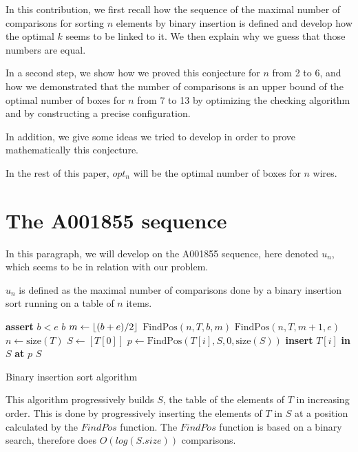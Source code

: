\documentclass[11pt, a4paper]{article}
\DeclarePairedDelimiter{\floor}{\lfloor}{\rfloor}
\begin{document}
In this contribution, we first recall how the sequence of the maximal number of
comparisons for sorting $n$ elements by binary insertion is defined and develop
how the optimal $k$ seems to be linked to it.  We then explain why we guess that
those numbers are equal.

In a second step, we show how we proved this conjecture for $n$ from 2 to 6, and
how we demonstrated that the number of comparisons is an upper bound of the
optimal number of boxes for $n$ from 7 to 13 by optimizing the checking
algorithm and by constructing a precise configuration.

In addition, we give some ideas we tried to develop in order to prove
mathematically this conjecture.

In the rest of this paper, $opt_n$ will be the optimal number of boxes for $n$
wires.


\section{The A001855 sequence}

In this paragraph, we will develop on the A001855 sequence, here denoted $u_n$,
which seems to be in relation with our problem.

$u_n$ is defined as the maximal number of comparisons done by a binary
insertion sort running on a table of $n$ items.

\begin{algorithm}
\begin{algorithmic}
	\State \textbf{assert} $b < e$
		\State \Return $b$
	\Else
		\State $m \gets \floor{(b+e)/2}$
			\State \Return $\mathrm{FindPos}(n, T, b, m)$
		\Else
			\State \Return $\mathrm{FindPos}(n, T, m+1, e)$
		\EndIf
	\EndIf
\EndFunction
	\\
	\State $n \gets \mathrm{size}(T)$
	\State $S \gets [ T[0] ]$
		\State $p \gets \mathrm{FindPos}(T[i], S, 0, \mathrm{size}(S))$
		\State \textbf{insert} $T[i]$ \textbf{in} $S$ \textbf{at} $p$
	\EndFor
	\State \Return $S$
\EndFunction
\end{algorithmic}
\caption{Binary insertion sort algorithm}
\end{algorithm}

This algorithm progressively builds $S$, the table of the elements of $T$ in
increasing order. This is done by progressively inserting the elements of $T$ in
$S$ at a position calculated by the $FindPos$ function. The $FindPos$ function
is based on a binary search, therefore does $O(log(S.size))$ comparisons.
\end{document}
